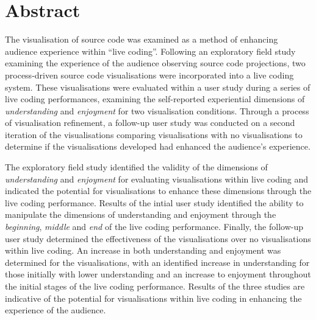 
\chapter*{Abstract}
\label{chap:abstract}

The visualisation of source code was examined as a method of enhancing audience experience within ``live coding''. Following an exploratory field study examining the experience of the audience observing source code projections, two process-driven source code visualisations were incorporated into a live coding system. These visualisations were evaluated within a user study during a series of live coding performances, examining the self-reported experiential dimensions of \emph{understanding} and \emph{enjoyment} for two visualisation conditions. Through a process of visualisation refinement, a follow-up user study was conducted on a second iteration of the visualisations comparing visualisations with no visualisations to determine if the visualisations developed had enhanced the audience's experience.

The exploratory field study identified the validity of the dimensions of \emph{understanding} and \emph{enjoyment} for evaluating visualisations within live coding and indicated the potential for visualisations to enhance these dimensions through the live coding performance. Results of the intial user study identified the ability to manipulate the dimensions of understanding and enjoyment through the \emph{beginning}, \emph{middle} and \emph{end} of the live coding performance. Finally, the follow-up user study determined the effectiveness of the visualisations over no visualisations within live coding. An increase in both understanding and enjoyment was determined for the visualisations, with an identified increase in understanding for those initially with lower understanding and an increase to enjoyment throughout the initial stages of the live coding performance. Results of the three studies are indicative of the potential for visualisations within live coding in enhancing the experience of the audience. 

